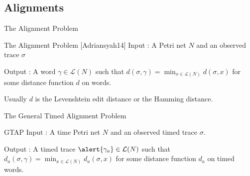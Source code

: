\documentclass[10pt]{beamer}
\begin{document}
\subsection{Alignments}
\begin{frame}{The Alignment Problem}
	\begin{block}{The Alignment Problem [Adriansyah14]}
	Input : A Petri net $N$  and an observed trace $\sigma$
	
	\vfill 
	
	Output : A word $\gamma \in \mathcal{L}(N)$ such that $d(\sigma, \gamma) = \min_{x \in \mathcal{L}(N)} d(\sigma, x)$ for some distance function $d$ on words. 
	\end{block}
\vfill 

Usually $d$ is the Levenshtein edit distance or the Hamming distance. 
\end{frame}

\begin{frame}{The General Timed Alignment Problem}

	\begin{block}{GTAP}
		Input : A time Petri net $N$ and an observed timed trace $\sigma$. 
		\vfill 
		
		Output : A timed trace $\alert{\gamma_a}
		\in \mathcal{L}(N)$ such that $d_a(\sigma, \gamma) = \min_{x \in \mathcal{L}(N)} d_a(\sigma, x)$ for some distance function $d_a$ on timed words. 
		\
	\end{block}

\end{frame}
\end{document}
